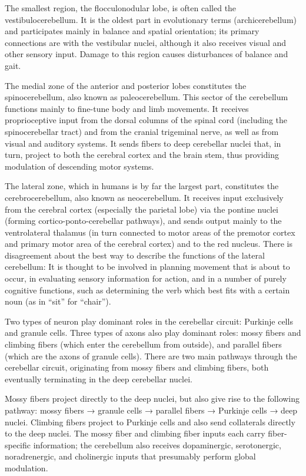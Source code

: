 The smallest region, the flocculonodular lobe, is often called the vestibulocerebellum. It is the oldest part in evolutionary terms (archicerebellum) and participates mainly in balance and spatial orientation; its primary connections are with the vestibular nuclei, although it also receives visual and other sensory input. Damage to this region causes disturbances of balance and gait.

The medial zone of the anterior and posterior lobes constitutes the spinocerebellum, also known as paleocerebellum. This sector of the cerebellum functions mainly to fine-tune body and limb movements. It receives proprioceptive input from the dorsal columns of the spinal cord (including the spinocerebellar tract) and from the cranial trigeminal nerve, as well as from visual and auditory systems. It sends fibers to deep cerebellar nuclei that, in turn, project to both the cerebral cortex and the brain stem, thus providing modulation of descending motor systems.

The lateral zone, which in humans is by far the largest part, constitutes the cerebrocerebellum, also known as neocerebellum. It receives input exclusively from the cerebral cortex (especially the parietal lobe) via the pontine nuclei (forming cortico-ponto-cerebellar pathways), and sends output mainly to the ventrolateral thalamus (in turn connected to motor areas of the premotor cortex and primary motor area of the cerebral cortex) and to the red nucleus. There is disagreement about the best way to describe the functions of the lateral cerebellum: It is thought to be involved in planning movement that is about to occur, in evaluating sensory information for action, and in a number of purely cognitive functions, such as determining the verb which best fits with a certain noun (as in ``sit'' for ``chair'').

Two types of neuron play dominant roles in the cerebellar circuit: Purkinje cells and granule cells. Three types of axons also play dominant roles: mossy fibers and climbing fibers (which enter the cerebellum from outside), and parallel fibers (which are the axons of granule cells). There are two main pathways through the cerebellar circuit, originating from mossy fibers and climbing fibers, both eventually terminating in the deep cerebellar nuclei.

Mossy fibers project directly to the deep nuclei, but also give rise to the following pathway: mossy fibers → granule cells → parallel fibers → Purkinje cells → deep nuclei. Climbing fibers project to Purkinje cells and also send collaterals directly to the deep nuclei. The mossy fiber and climbing fiber inputs each carry fiber-specific information; the cerebellum also receives dopaminergic, serotonergic, noradrenergic, and cholinergic inputs that presumably perform global modulation.

